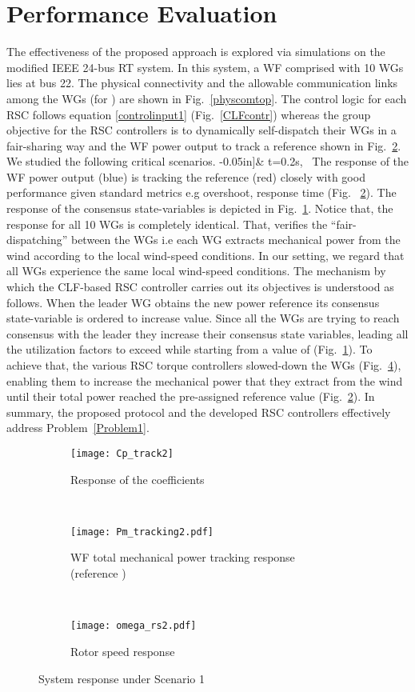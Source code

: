 \documentclass[letterpaper, 10 pt, conference]{ieeeconf}
\begin{document}
\section{Performance Evaluation}
The effectiveness of the proposed approach is explored via simulations on the modified IEEE 24-bus RT system. In this system, a WF comprised with 10 WGs lies at bus 22.  The physical connectivity and the allowable communication links among the WGs (for ) are shown in Fig.~\ref{physcomtop}. The control logic for each RSC follows equation \eqref{controlinput1} (Fig.~\ref{CLFcontr}) whereas the group objective for the RSC controllers is to dynamically self-dispatch their WGs in a fair-sharing way and the WF power output to track a reference shown in Fig.~\ref{pwftrack}.  We studied the following critical scenarios.
-0.05in]&  t=0.2s, \nonumber\
The  response of the WF power output (blue) is tracking the reference (red) closely with good performance given standard metrics e.g overshoot, response time (Fig.~ \ref{pwftrack}).  The response of the consensus state-variables is depicted in Fig.~\ref{cptrack}.  Notice that, the response for all 10 WGs is completely identical. That, verifies the ``fair-dispatching'' between the WGs i.e each WG extracts mechanical power from the wind according to the local wind-speed conditions. In our setting, we regard that all WGs experience the same local wind-speed conditions. The mechanism by which the CLF-based RSC controller carries out its objectives is understood as follows. When the leader WG obtains the new power reference its consensus state-variable is ordered to increase value. Since all the WGs are trying to reach consensus with the leader they increase their consensus state variables, leading all the utilization factors to exceed  while starting from a value of  (Fig.~\ref{cptrack}).  To achieve that, the various RSC torque controllers slowed-down the WGs (Fig.~\ref{rotortrack}), enabling them to increase the mechanical power that they extract from the wind until their total power reached the pre-assigned reference value (Fig.~\ref{pwftrack}).  In summary,  the proposed protocol and the developed RSC controllers effectively  address  Problem~\ref{Problem1}.
\begin{figure}
\centering
  \begin{subfigure}{0.35\textwidth}
\texttt{[image: Cp\_track2]}
\caption{Response of the  coefficients }
\label{cptrack}
\end{subfigure}
\\
  \begin{subfigure}{0.35\textwidth}
\texttt{[image: Pm\_tracking2.pdf]}
\caption{WF total mechanical power tracking response (reference )}
\label{pwftrack}
\end{subfigure}\\
  \begin{subfigure}{0.35\textwidth}
\texttt{[image: omega\_rs2.pdf]}
\caption{Rotor speed response}
\label{rotortrack}
\end{subfigure}
\caption{System response under Scenario 1}
\end{figure}
\end{document}

